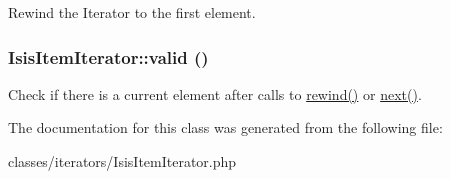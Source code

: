 \label{classIsisItemIterator_ab87a4387a9fd745366ccf8e138a9f60c}
Rewind the Iterator to the first element. \hypertarget{classIsisItemIterator_aacea6ed6fd269ef1549ce86820da8b3b}{
\subsubsection[{valid}]{\setlength{\rightskip}{0pt plus 5cm}IsisItemIterator::valid ()}}
\label{classIsisItemIterator_aacea6ed6fd269ef1549ce86820da8b3b}
Check if there is a current element after calls to \hyperlink{classIsisItemIterator_ab87a4387a9fd745366ccf8e138a9f60c}{rewind()} or \hyperlink{classIsisItemIterator_a17c6a2e50a0ca67feb92f4ffc4cbec23}{next()}. 

The documentation for this class was generated from the following file:\begin{DoxyCompactItemize}
\item 
classes/iterators/IsisItemIterator.php\end{DoxyCompactItemize}
